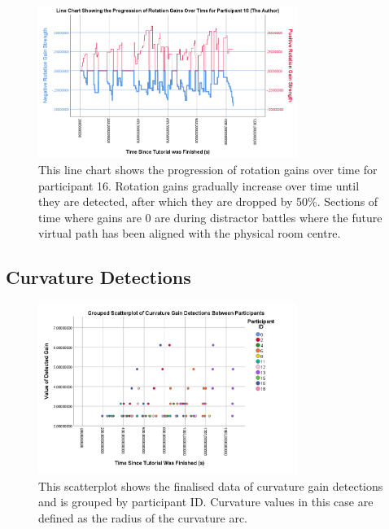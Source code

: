 \begin{figure}[tbph]
    \centering
    \includegraphics[width=0.75\textwidth]{figures/graphs/rotationGainProgressionAuthor.png}
    \caption[Line Chart Showing the Progression of Rotation Gains for Participant 16]{This line chart shows the progression of rotation gains over time for participant 16. Rotation gains gradually increase over time until they are detected, after which they are dropped by 50\%. Sections of time where gains are 0 are during distractor battles where the future virtual path has been aligned with the physical room centre.}
    \label{fig:authorRotationProgression}
\end{figure}

\subsection{Curvature Detections}
\begin{figure}[tbph]
    \centering
    \includegraphics[width=0.75\textwidth]{figures/graphs/CurvatureDetectionScatter.png}
    \caption[Finalised Detection Scatterplot For Curvature Gains, Grouped by Participant ID]{This scatterplot shows the finalised data of curvature gain detections and is grouped by participant ID. Curvature values in this case are defined as the radius of the curvature arc.}
    \label{fig:curvatureDetectionData}
\end{figure}

